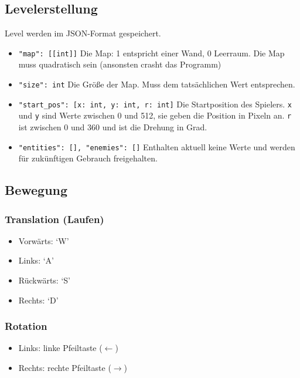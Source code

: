 \documentclass[a4paper,titlepage]{article}
\begin{document}
\subsection{Levelerstellung}
Level werden im JSON-Format gespeichert.
\begin{itemize}
	\item \verb|"map": [[int]]| Die Map: 1 entspricht einer Wand, 0 Leerraum. Die Map muss quadratisch sein (ansonsten crasht das Programm)
	\item \verb|"size": int| Die Größe der Map. Muss dem tatsächlichen Wert entsprechen.
	\item \verb|"start_pos": [x: int, y: int, r: int]| Die Startposition des Spielers. \verb|x| und \verb|y| sind Werte zwischen 0 und 512, sie geben die Position in Pixeln an. \verb|r| ist zwischen 0 und 360 und ist die Drehung in Grad.
	\item \verb|"entities": [], "enemies": []| Enthalten aktuell keine Werte und werden für zukünftigen Gebrauch freigehalten.
	
\end{itemize}

\subsection{Bewegung}

\subsubsection*{Translation (Laufen)}
\begin{itemize}
\item Vorwärts: `W'
\item Links: `A'
\item Rückwärts: `S'
\item Rechts: `D'
\end{itemize}

\subsubsection*{Rotation}
\begin{itemize}
\item Links: linke Pfeiltaste ($\leftarrow$)
\item Rechts: rechte Pfeiltaste ($\rightarrow$)
\end{itemize}
\end{document}
